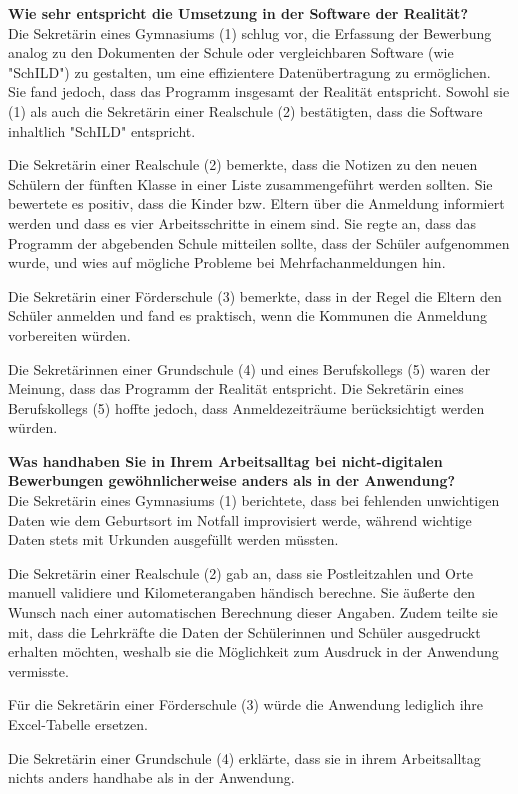 \textbf{Wie sehr entspricht die Umsetzung in der Software der Realität?}\\
Die Sekretärin eines Gymnasiums (1) schlug vor, die Erfassung der Bewerbung analog zu den Dokumenten der Schule oder vergleichbaren Software (wie "SchILD") zu gestalten, um eine effizientere Datenübertragung zu ermöglichen. Sie fand jedoch, dass das Programm insgesamt der Realität entspricht. Sowohl sie (1) als auch die Sekretärin einer Realschule (2) bestätigten, dass die Software inhaltlich "SchILD" entspricht.

Die Sekretärin einer Realschule (2) bemerkte, dass die Notizen zu den neuen Schülern der fünften Klasse in einer Liste zusammengeführt werden sollten. Sie bewertete es positiv, dass die Kinder bzw. Eltern über die Anmeldung informiert werden und dass es vier Arbeitsschritte in einem sind. Sie regte an, dass das Programm der abgebenden Schule mitteilen sollte, dass der Schüler aufgenommen wurde, und wies auf mögliche Probleme bei Mehrfachanmeldungen hin.

Die Sekretärin einer Förderschule (3) bemerkte, dass in der Regel die Eltern den Schüler anmelden und fand es praktisch, wenn die Kommunen die Anmeldung vorbereiten würden.

Die Sekretärinnen einer Grundschule (4) und eines Berufskollegs (5) waren der Meinung, dass das Programm der Realität entspricht. Die Sekretärin eines Berufskollegs (5) hoffte jedoch, dass Anmeldezeiträume berücksichtigt werden würden.

\textbf{Was handhaben Sie in Ihrem Arbeitsalltag bei nicht-digitalen Bewerbungen gewöhnlicherweise anders als in der Anwendung?}\\
Die Sekretärin eines Gymnasiums (1) berichtete, dass bei fehlenden unwichtigen Daten wie dem Geburtsort im Notfall improvisiert werde, während wichtige Daten stets mit Urkunden ausgefüllt werden müssten.

Die Sekretärin einer Realschule (2) gab an, dass sie Postleitzahlen und Orte manuell validiere und Kilometerangaben händisch berechne. Sie äußerte den Wunsch nach einer automatischen Berechnung dieser Angaben. Zudem teilte sie mit, dass die Lehrkräfte die Daten der Schülerinnen und Schüler ausgedruckt erhalten möchten, weshalb sie die Möglichkeit zum Ausdruck in der Anwendung vermisste.

Für die Sekretärin einer Förderschule (3) würde die Anwendung lediglich ihre Excel-Tabelle ersetzen.

Die Sekretärin einer Grundschule (4) erklärte, dass sie in ihrem Arbeitsalltag nichts anders handhabe als in der Anwendung.

